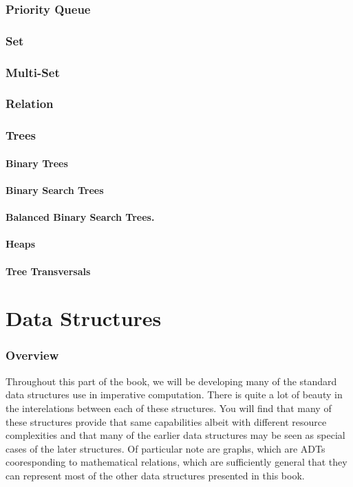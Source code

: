 \documentclass[12pt, letterpaper]{book}
\begin{document}
\section{Priority Queue}
\section{Set}
\section{Multi-Set}
\section{Relation}
\section{Trees}
	\subsection{Binary Trees}
	\subsection{Binary Search Trees}
	\subsection{Balanced Binary Search Trees.}
	\subsection{Heaps}
	\subsection{Tree Transversals} \label{tree transversals}


\part{Data Structures}

\section[Overview]{Overview}

Throughout this part of the book, we will be developing many of the standard data structures use in imperative computation. There is quite a lot of beauty in the interelations between each of these structures. You will find that many of these structures provide that same capabilities albeit with different resource complexities and that many of the earlier data structures may be seen as special cases of the later structures. Of particular note are graphs, which are ADTs cooresponding to mathematical relations, which are sufficiently general that they can represent most of the other data structures presented in this book.
\end{document}
